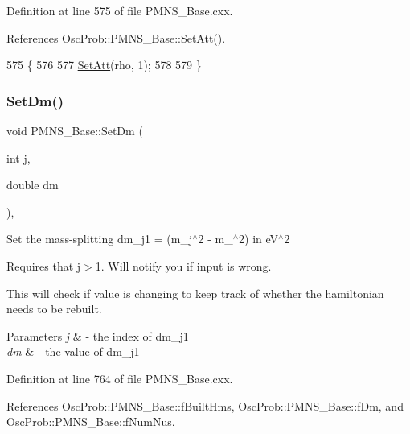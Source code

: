 Definition at line 575 of file P\+M\+N\+S\+\_\+\+Base.\+cxx.



References Osc\+Prob\+::\+P\+M\+N\+S\+\_\+\+Base\+::\+Set\+Att().


\begin{DoxyCode}
575                                                \{
576 
577   \hyperlink{classOscProb_1_1PMNS__Base_aba565962a440d14bee7a2a96d2eca2c5}{SetAtt}(rho, 1);
578 
579 \}
\end{DoxyCode}
\mbox{\label{classOscProb_1_1PMNS__Base_a492243b22fb1b783cd2943f507cff970}} 
\subsubsection{\texorpdfstring{Set\+Dm()}{SetDm()}}
{\footnotesize\ttfamily void P\+M\+N\+S\+\_\+\+Base\+::\+Set\+Dm (\begin{DoxyParamCaption}\item[{int}]{j,  }\item[{double}]{dm }\end{DoxyParamCaption})\hspace{0.3cm}{\ttfamily [virtual]}, {\ttfamily [inherited]}}

Set the mass-\/splitting dm\+\_\+j1 = (m\+\_\+j$^\wedge$2 -\/ m\+\_$^\wedge$2) in e\+V$^\wedge$2

Requires that j$>$1. Will notify you if input is wrong.

This will check if value is changing to keep track of whether the hamiltonian needs to be rebuilt.


\begin{DoxyParams}{Parameters}
{\em j} & -\/ the index of dm\+\_\+j1 \\
\hline
{\em dm} & -\/ the value of dm\+\_\+j1 \\
\hline
\end{DoxyParams}


Definition at line 764 of file P\+M\+N\+S\+\_\+\+Base.\+cxx.



References Osc\+Prob\+::\+P\+M\+N\+S\+\_\+\+Base\+::f\+Built\+Hms, Osc\+Prob\+::\+P\+M\+N\+S\+\_\+\+Base\+::f\+Dm, and Osc\+Prob\+::\+P\+M\+N\+S\+\_\+\+Base\+::f\+Num\+Nus.



